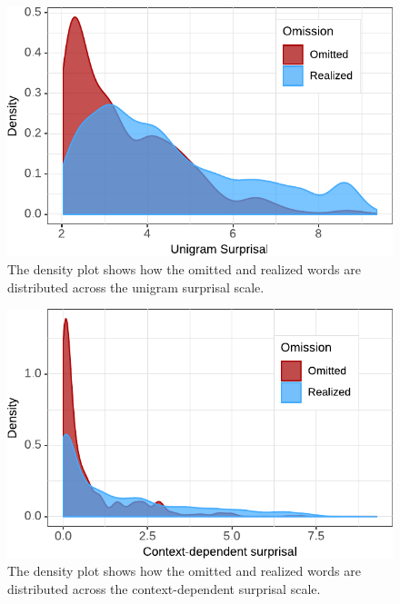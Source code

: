 \begin{figure}[p]
  \includegraphics{figures/scr_production_density_unigram}
   \caption{The density plot shows how the omitted and realized words are distributed across the unigram surprisal scale.\label{fig:production_density-unigram}}
\end{figure}

\begin{figure}[p]
  \includegraphics{figures/scr_production_density_context}
     \caption{The density plot shows how the omitted and realized words are distributed across the context-dependent surprisal scale.\label{fig:production_density-context}}
\end{figure}

